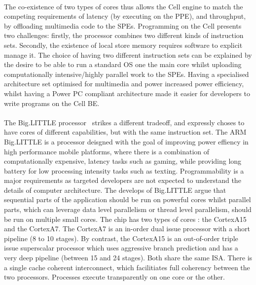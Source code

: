 \paragraph{} The co-existence of two types of cores thus allows the Cell engine to match
the competing requirements of latency (by executing on the PPE),
and throughput, by offloading multimedia code to the SPEs. 
Programming on the Cell presents two challenges: firstly, the processor
combines two different kinds of instruction sets. Secondly, the existence of 
local store memory requires software to explicit manage it. 
The choice of having two different instruction sets can be explained 
by the desire to be able to run a standard OS one the main 
core whilst uploading computationally intensive/highly parallel work 
to the SPEs. Having a specialised architecture set optimised for multimedia
 and power increased power efficiency, whilst having a Power PC compliant 
architecture made it easier for developers to write programs on the Cell BE.  

\paragraph{} The Big.LITTLE processor~\cite{greenhalgh2011biglittle} strikes 
a different tradeoff, and expressly choses to have cores of different capabilities, but
with the same instruction set. The ARM Big.LITTLE is a processor
deisgned with the goal of improving power effiency in high
performance mobile platforms, where there is a combination
of computationally expensive, latency tasks such as gaming, 
while providing long battery for low processing intensity tasks such
as texting. Programmability is a major requirements as targeted developers
are not expected to understand the details of computer architecture. 
The develops of Big.LITTLE argue that sequential parts of the application 
should be run on powerful cores whilst parallel parts, which can leverage data
level parallelism or thread level parallelism, should be run
on multiple small cores. The chip has two types of cores
: the CortexA15 and the CortexA7. The CortexA7 is an in-order dual issue
processor with a short pipeline (8 to 10 stages). By contrast,  the CortexA15
 is an out-of-order triple issue superscalar processor
which uses aggressive branch prediction and has a very deep pipeline
(between 15 and 24 stages). Both share the same ISA. There is a single cache
coherent interconnect, which facilitiates full coherency between the 
two processors. Processes execute transparently on one core or the other.

